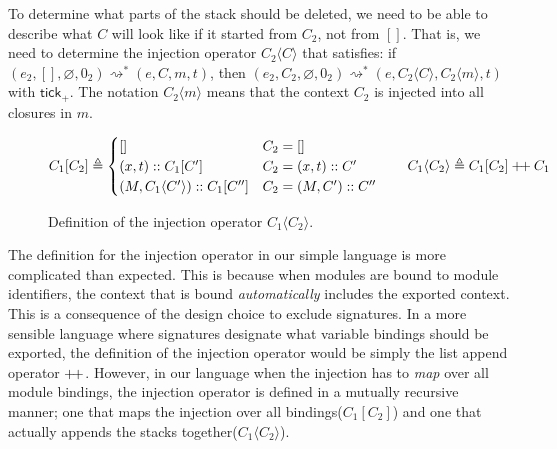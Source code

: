 \documentclass[acmsmall,review]{acmart}\settopmatter{printfolios=true,printccs=false,printacmref=false}
\theoremstyle{definition}
\newcommand*{\cons}{::}
\newcommand*{\mem}{m}
\newcommand*{\doubleplus}{\ensuremath{\mathbin{+\mkern-3mu+}}}
\newcommand*{\tick}{\mathsf{tick}}
\newcommand*{\mapinject}[2]{{#1}[{#2}]}
\newcommand*{\inject}[2]{{#1}\langle{#2}\rangle}
\begin{document}
To determine what parts of the stack should be deleted, we need to be able to describe what $C$ will look like if it started from $C_2$, not from $[]$.
That is, we need to determine the injection operator $\inject{C_2}{C}$ that satisfies:
if $(e_2,[],\varnothing,0_2)\rightsquigarrow^*(e,C,\mem,t)$, then $(e_2,C_2,\varnothing,0_2)\rightsquigarrow^*(e,\inject{C_2}{C},\inject{C_2}{\mem},t)$ with $\tick_+$.
The notation $\inject{C_2}{\mem}$ means that the context $C_2$ is injected into all closures in $\mem$.

\begin{figure}[h!]
  \footnotesize
  \[
    \mapinject{C_{1}}{C_{2}}\triangleq
    \begin{cases}
      []                                                 & C_{2}=[]              \\
      (x, t)\cons\mapinject{C_{1}}{C'}                   & C_{2}=(x,t)\cons C'   \\
      (M, \inject{C_{1}}{C'})\cons\mapinject{C_{1}}{C''} & C_{2}=(M,C')\cons C''
    \end{cases}
    \qquad
    \inject{C_{1}}{C_{2}}\triangleq \mapinject{C_{1}}{C_{2}}\doubleplus C_{1}
  \]
  \caption{Definition of the injection operator $\inject{C_1}{C_2}$.}
  \label{fig:concinject}
\end{figure}

The definition for the injection operator in our simple language is more complicated than expected.
This is because when modules are bound to module identifiers, the context that is bound \emph{automatically} includes the exported context.
This is a consequence of the design choice to exclude signatures.
In a more sensible language where signatures designate what variable bindings should be exported, the definition of the injection operator would be simply the list append operator $\doubleplus$.
However, in our language when the injection has to \emph{map} over all module bindings, the injection operator is defined in a mutually recursive manner; one that maps the injection over all bindings($\mapinject{C_1}{C_2}$) and one that actually appends the stacks together($\inject{C_1}{C_2}$).
\end{document}
